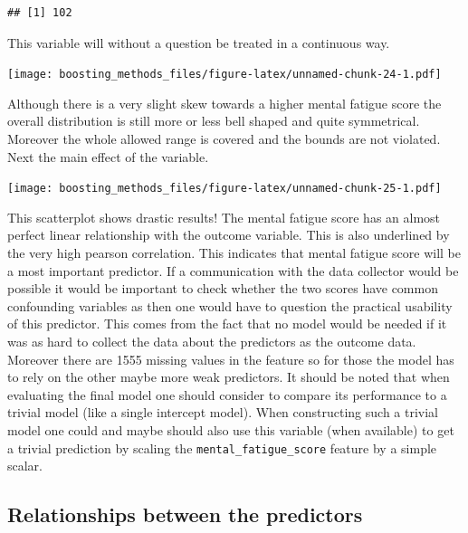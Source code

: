 \documentclass[
]{book}
\newenvironment{Shaded}{\begin{snugshade}}{\end{snugshade}}
\newcommand{\CommentTok}[1]{\textcolor[rgb]{0.56,0.35,0.01}{\textit{#1}}}
\newcommand{\FunctionTok}[1]{\textcolor[rgb]{0.00,0.00,0.00}{#1}}
\newcommand{\NormalTok}[1]{#1}
\newcommand{\SpecialCharTok}[1]{\textcolor[rgb]{0.00,0.00,0.00}{#1}}
\begin{document}
\begin{Shaded}
\end{Shaded}

\begin{verbatim}
## [1] 102
\end{verbatim}

This variable will without a question be treated in a continuous way.

\texttt{[image: boosting\_methods\_files/figure-latex/unnamed-chunk-24-1.pdf]}

Although there is a very slight skew towards a higher mental fatigue score the overall distribution is still more or less bell shaped and quite symmetrical. Moreover the whole allowed range is covered and the bounds are not violated. Next the main effect of the variable.

\texttt{[image: boosting\_methods\_files/figure-latex/unnamed-chunk-25-1.pdf]}

This scatterplot shows drastic results! The mental fatigue score has an almost perfect linear relationship with the outcome variable. This is also underlined by the very high pearson correlation. This indicates that mental fatigue score will be a most important predictor. If a communication with the data collector would be possible it would be important to check whether the two scores have common confounding variables as then one would have to question the practical usability of this predictor. This comes from the fact that no model would be needed if it was as hard to collect the data about the predictors as the outcome data. Moreover there are 1555 missing values in the feature so for those the model has to rely on the other maybe more weak predictors. It should be noted that when evaluating the final model one should consider to compare its performance to a trivial model (like a single intercept model). When constructing such a trivial model one could and maybe should also use this variable (when available) to get a trivial prediction by scaling the \texttt{mental\_fatigue\_score} feature by a simple scalar.

\hypertarget{relationships-between-the-predictors}{%
\subsection{Relationships between the predictors}\label{relationships-between-the-predictors}}
\end{document}
